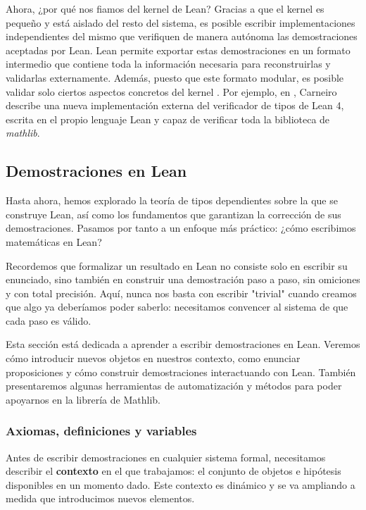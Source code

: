 \documentclass{article}
\begin{document}
Ahora, ¿por qué nos fiamos del kernel de Lean? Gracias a que el kernel es pequeño y está aislado del resto del sistema, es posible escribir implementaciones independientes del mismo que verifiquen de manera autónoma las demostraciones aceptadas por Lean. Lean permite exportar estas demostraciones en un formato intermedio que contiene toda la información necesaria para reconstruirlas y validarlas externamente. Además, puesto que este formato modular, es posible validar solo ciertos aspectos concretos del kernel \cite{bailey2024type}. Por ejemplo, en \cite{carneiro2024lean4lean}, Carneiro describe una nueva implementación externa del verificador de tipos de Lean 4, escrita en el propio lenguaje Lean y capaz de verificar toda la biblioteca de \textit{mathlib}.



\subsection{Demostraciones en Lean}

Hasta ahora, hemos explorado la teoría de tipos dependientes sobre la que se construye Lean, así como los fundamentos que garantizan la corrección de sus demostraciones. Pasamos por tanto a un enfoque más práctico: ¿cómo escribimos matemáticas en Lean?

Recordemos que formalizar un resultado en Lean no consiste solo en escribir su enunciado, sino también en construir una demostración paso a paso, sin omiciones y con total precisión. Aquí, nunca nos basta con escribir "trivial" cuando creamos que algo ya deberíamos poder saberlo: necesitamos convencer al sistema de que cada paso es válido.

Esta sección está dedicada a aprender a escribir demostraciones en Lean. Veremos cómo introducir nuevos objetos en nuestros contexto, como enunciar proposiciones y cómo construir demostraciones interactuando con Lean. También presentaremos algunas herramientas de automatización y métodos para poder apoyarnos en la librería de Mathlib.

\subsubsection{Axiomas, definiciones y variables}

Antes de escribir demostraciones en cualquier sistema formal, necesitamos describir el \textbf{contexto} en el que trabajamos: el conjunto de objetos e hipótesis disponibles en un momento dado. Este contexto es dinámico y se va ampliando a medida que introducimos nuevos elementos.
\end{document}
